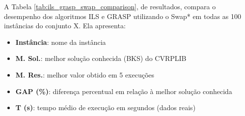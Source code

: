 A Tabela \ref{tab:ils_grasp_swap_comparison}, de resultados, compara o desempenho dos algoritmos ILS e GRASP utilizando o Swap* em todas as 100 instâncias do conjunto X. Ela apresenta:
\begin{itemize}
    \item \textbf{Instância}: nome da instância
    \item \textbf{M. Sol.}: melhor solução conhecida (BKS) do CVRPLIB
    \item \textbf{M. Res.}: melhor valor obtido em 5 execuções
    \item \textbf{GAP (\%)}: diferença percentual em relação à melhor solução conhecida
    \item \textbf{T (s)}: tempo médio de execução em segundos (dados reais)
\end{itemize}

